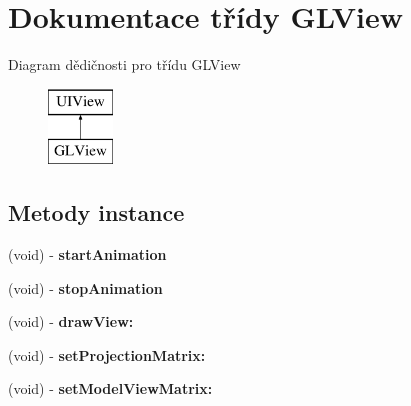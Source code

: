 \hypertarget{interface_g_l_view}{\section{Dokumentace třídy G\-L\-View}
\label{d8/d4d/interface_g_l_view}
}
Diagram dědičnosti pro třídu G\-L\-View\begin{figure}[H]
\begin{center}
\leavevmode
\includegraphics[height=2.000000cm]{d8/d4d/interface_g_l_view}
\end{center}
\end{figure}
\subsection*{Metody instance}
\begin{DoxyCompactItemize}
\item 
\hypertarget{interface_g_l_view_a22d6451905d60e51e3e23a486a2243de}{(void) -\/ {\bfseries start\-Animation}}\label{d8/d4d/interface_g_l_view_a22d6451905d60e51e3e23a486a2243de}

\item 
\hypertarget{interface_g_l_view_ad37cc85d6212e293a99201d109290411}{(void) -\/ {\bfseries stop\-Animation}}\label{d8/d4d/interface_g_l_view_ad37cc85d6212e293a99201d109290411}

\item 
\hypertarget{interface_g_l_view_a8d86e3e84cafd72716c4bbec79011ccc}{(void) -\/ {\bfseries draw\-View\-:}}\label{d8/d4d/interface_g_l_view_a8d86e3e84cafd72716c4bbec79011ccc}

\item 
\hypertarget{interface_g_l_view_adf40e47ba4b2e100ae12b9e0b6f54f9a}{(void) -\/ {\bfseries set\-Projection\-Matrix\-:}}\label{d8/d4d/interface_g_l_view_adf40e47ba4b2e100ae12b9e0b6f54f9a}

\item 
\hypertarget{interface_g_l_view_a43df1d959c1218d0a37b47bfd5dc6395}{(void) -\/ {\bfseries set\-Model\-View\-Matrix\-:}}\label{d8/d4d/interface_g_l_view_a43df1d959c1218d0a37b47bfd5dc6395}

\end{DoxyCompactItemize}

